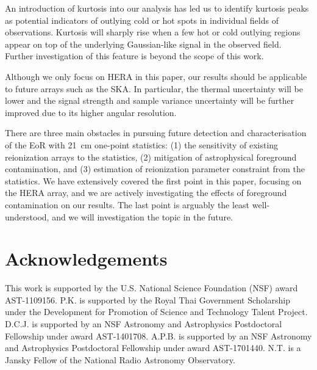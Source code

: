 \documentclass[fleqn,usenatbib]{mnras}
\begin{document}
An introduction of kurtosis into our analysis has led us to identify kurtosis peaks as potential indicators of outlying cold or hot spots in individual fields of observations. Kurtosis will sharply rise when a few hot or cold outlying regions appear on top of the underlying Gaussian-like signal in the observed field. Further investigation of this feature is beyond the scope of this work.

Although we only focus on HERA in this paper, our results should be applicable to future arrays such as the SKA. In particular, the thermal uncertainty will be lower and the signal strength and sample variance uncertainty will be further improved due to its higher angular resolution.

There are three main obstacles in pursuing future detection and characterisation of the EoR with 21~cm one-point statistics: (1) the sensitivity of existing reionization arrays to the statistics, (2) mitigation of astrophysical foreground contamination, and (3) estimation of reionization parameter constraint from the statistics. We have extensively covered the first point in this paper, focusing on the HERA array, and we are actively investigating the effects of foreground contamination on our results. The last point is arguably the least well-understood, and we will investigation the topic in the future.


\section*{Acknowledgements}
This work is supported by the U.S. National Science Foundation (NSF) award AST-1109156. P.K. is supported by the Royal Thai Government Scholarship under the Development for Promotion of Science and Technology Talent Project. D.C.J. is supported by an NSF Astronomy and Astrophysics Postdoctoral Fellowship under award AST-1401708. A.P.B. is supported by an NSF Astronomy and
Astrophysics Postdoctoral Fellowship under award AST-1701440. N.T. is a Jansky Fellow of the National Radio Astronomy Observatory.








\end{document}
